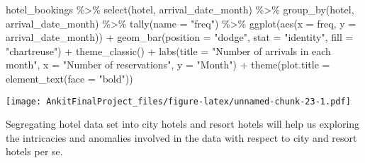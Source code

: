 \documentclass[
]{article}
\newenvironment{Shaded}{\begin{snugshade}}{\end{snugshade}}
\newcommand{\AttributeTok}[1]{\textcolor[rgb]{0.77,0.63,0.00}{#1}}
\newcommand{\FunctionTok}[1]{\textcolor[rgb]{0.00,0.00,0.00}{#1}}
\newcommand{\NormalTok}[1]{#1}
\newcommand{\OtherTok}[1]{\textcolor[rgb]{0.56,0.35,0.01}{#1}}
\newcommand{\SpecialCharTok}[1]{\textcolor[rgb]{0.00,0.00,0.00}{#1}}
\newcommand{\StringTok}[1]{\textcolor[rgb]{0.31,0.60,0.02}{#1}}
\begin{document}
\begin{Shaded}
\begin{Highlighting}[]
\NormalTok{hotel\_bookings }\SpecialCharTok{\%\textgreater{}\%}
  \FunctionTok{select}\NormalTok{(hotel, arrival\_date\_month) }\SpecialCharTok{\%\textgreater{}\%} \FunctionTok{group\_by}\NormalTok{(hotel, arrival\_date\_month) }\SpecialCharTok{\%\textgreater{}\%} 
    \FunctionTok{tally}\NormalTok{(}\AttributeTok{name =} \StringTok{"freq"}\NormalTok{) }\SpecialCharTok{\%\textgreater{}\%}
  \FunctionTok{ggplot}\NormalTok{(}\FunctionTok{aes}\NormalTok{(}\AttributeTok{x =}\NormalTok{ freq, }\AttributeTok{y =}\NormalTok{ arrival\_date\_month)) }\SpecialCharTok{+}
  \FunctionTok{geom\_bar}\NormalTok{(}\AttributeTok{position =} \StringTok{"dodge"}\NormalTok{, }\AttributeTok{stat =} \StringTok{"identity"}\NormalTok{, }\AttributeTok{fill =} \StringTok{"chartreuse"}\NormalTok{) }\SpecialCharTok{+}
  \FunctionTok{theme\_classic}\NormalTok{() }\SpecialCharTok{+}
  \FunctionTok{labs}\NormalTok{(}\AttributeTok{title =} \StringTok{"Number of arrivals in each month"}\NormalTok{, }\AttributeTok{x =} \StringTok{"Number of reservations"}\NormalTok{,}
       \AttributeTok{y =} \StringTok{"Month"}\NormalTok{) }\SpecialCharTok{+}
  \FunctionTok{theme}\NormalTok{(}\AttributeTok{plot.title =} \FunctionTok{element\_text}\NormalTok{(}\AttributeTok{face =} \StringTok{"bold"}\NormalTok{))}
\end{Highlighting}
\end{Shaded}

\texttt{[image: AnkitFinalProject\_files/figure-latex/unnamed-chunk-23-1.pdf]}

Segregating hotel data set into city hotels and resort hotels will help
us exploring the intricacies and anomalies involved in the data with
respect to city and resort hotels per se.

\begin{Shaded}
\end{Shaded}
\end{document}
